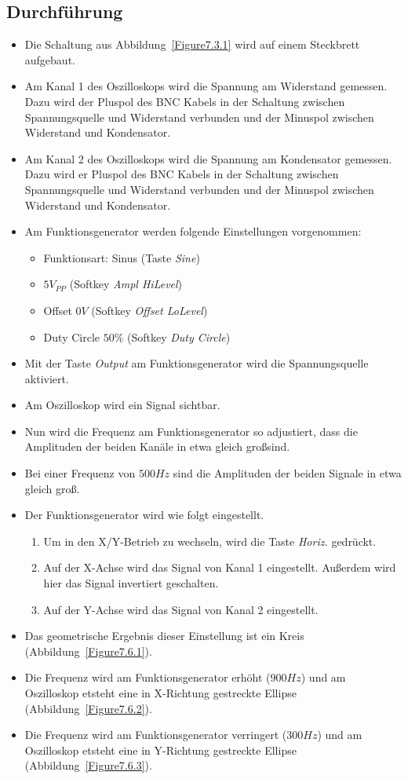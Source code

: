 \documentclass[12pt,a4paper,titlepage]{article}
\begin{document}
\subsection{Durchf\"uhrung}
\begin{itemize}
  \item Die Schaltung aus Abbildung~\ref{Figure7.3.1} wird auf einem Steckbrett aufgebaut.
  \item Am Kanal 1 des Oszilloskops wird die Spannung am Widerstand gemessen. Dazu wird der Pluspol des BNC Kabels in der Schaltung zwischen Spannungsquelle und Widerstand verbunden und der Minuspol zwischen Widerstand und Kondensator.
  \item Am Kanal 2 des Oszilloskops wird die Spannung am Kondensator gemessen. Dazu wird er Pluspol des BNC Kabels in der Schaltung zwischen Spannungsquelle und Widerstand verbunden und der Minuspol zwischen Widerstand und Kondensator.
  \item Am Funktionsgenerator werden folgende Einstellungen vorgenommen:
  \begin{itemize}
    \item Funktionsart: Sinus (Taste \textit{Sine})
    \item $5 V_{PP}$ (Softkey \textit{Ampl HiLevel})
    \item Offset $0 V$ (Softkey \textit{Offset LoLevel})
    \item Duty Circle $50 \%$ (Softkey \textit{Duty Circle})
  \end{itemize}
  \item Mit der Taste \textit{Output} am Funktionsgenerator wird die Spannungsquelle aktiviert.
  \item Am Oszilloskop wird ein Signal sichtbar.
  \item Nun wird die Frequenz am Funktionsgenerator so adjustiert, dass die Amplituden der beiden Kan\"ale in etwa gleich gro\ss  sind.
  \item Bei einer Frequenz von $500 Hz$ sind die Amplituden der beiden Signale in etwa gleich gro\ss .
  \item Der Funktionsgenerator wird wie folgt eingestellt.
  \begin{enumerate}
    \item Um in den X/Y-Betrieb zu wechseln, wird die Taste \textit{Horiz.} gedr\"uckt.
    \item Auf der X-Achse wird das Signal von Kanal 1 eingestellt. Au\ss erdem wird hier das Signal invertiert geschalten.
    \item Auf der Y-Achse wird das Signal von Kanal 2 eingestellt.
  \end{enumerate}
  \item Das geometrische Ergebnis dieser Einstellung ist ein Kreis (Abbildung~\ref{Figure7.6.1}).
  \item Die Frequenz wird am Funktionsgenerator erh\"oht ($900 Hz$) und am Oszilloskop etsteht eine in X-Richtung gestreckte Ellipse (Abbildung~\ref{Figure7.6.2}).
  \item Die Frequenz wird am Funktionsgenerator verringert ($300 Hz$) und am Oszilloskop etsteht eine in Y-Richtung gestreckte Ellipse (Abbildung~\ref{Figure7.6.3}).
\end{itemize}
\end{document}

